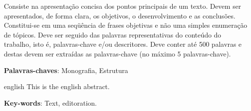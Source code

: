 \begin{resumo}
Consiste na apresentação concisa dos pontos principais de um texto. Devem ser apresentados, de forma clara, os objetivos, o desenvolvimento e as conclusões. Constitui-se em uma seqüência de frases objetivas e não uma simples enumeração de tópicos. Deve ser seguido das palavras representativas do conteúdo do trabalho, isto é, palavras-chave e/ou descritores. Deve conter até 500 palavras e destas devem ser extraídas as palavras-chave (no máximo 5 palavras-chave).

 \textbf{Palavras-chaves}: Monografia, Estrutura
\end{resumo}

\begin{resumo}[Abstract]
 \begin{otherlanguage*}{english}
   This is the english abstract.

   \vspace{\onelineskip}

   \noindent
   \textbf{Key-words}: Text, editoration.
 \end{otherlanguage*}
\end{resumo}